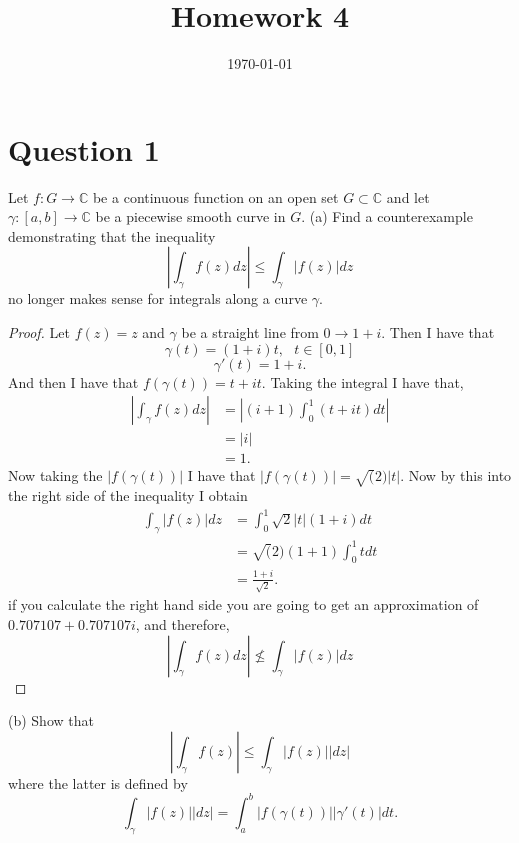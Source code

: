 \documentclass[10pt,two side,openright]{article}
\newcommand{\C}{\mathbb{C}}
\newcommand{\8}{\bar}
\newcommand{\f}{\frac}
\begin{document}
 
\title{Homework 4}
\author{}
\date{\today}
\maketitle 

\section{Question 1}
Let $f: G \to \C$ be a continuous function on an open set $G \subset \C$ and let $\gamma: [a,b] \to \C$ be a piecewise smooth curve in $G$. \newline \newline
(a) Find a counterexample demonstrating that the inequality 
\[ \left| \int_{\gamma} f(z) dz \right| \leq \int_{\gamma} | f(z)| dz \] 
no longer makes sense for integrals along a curve $\gamma$.  
\begin{proof}
Let $f(z) = z$ and $\gamma$ be a straight line from $0 \to 1+i$. Then I have that 
\[ \gamma(t) = (1+i)t, \ \ \ t \in [0,1] \] 
\[ \gamma'(t) = 1 + i. \] 
And then I have that $f(\gamma(t)) = t+it.$ Taking the integral I have that, 
\begin{align*}
\left| \int_{\gamma} f(z) dz \right| &= \left| (i+1) \int_{0}^{1} (t+ it) dt \right| \\
						 &= |i| \\
						 &= 1. 
\end{align*}
Now taking the $|f(\gamma(t))|$ I have that $|f(\gamma(t))| = \sqrt(2)|t|$. Now by this into the right side of the inequality I obtain
\begin{align*}
\int_{\gamma}|f(z)| dz &= \int_{0}^{1}\sqrt{2}|t|(1+i) dt \\
				 &=  \sqrt(2)(1+1)\int_{0}^{1} t dt \\
				 &= \f{1+i}{\sqrt{2}}. 
\end{align*} 
if you calculate the right hand side you are going to get an approximation of $0.707107 +0.707107i$, and therefore, 
\[ \left| \int_{\gamma} f(z) dz \right| \not\leq \int_{\gamma} | f(z)| dz \] 
\end{proof}
(b) Show that 
\[ \left| \int_{\gamma}f(z) \right| \leq \int_{\gamma} |f(z)||dz| \] 
where the latter is defined by 
\[ \int_{\gamma}|f(z)||dz| = \int_{a}^{b}|f(\gamma (t))|| \gamma '(t)| dt. \] 
\end{document}
